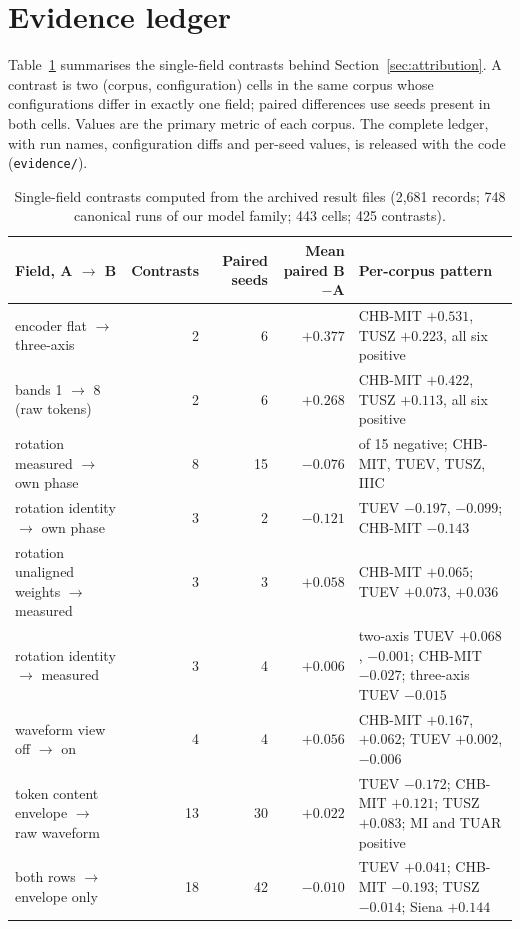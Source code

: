 \clearpage
\setcounter{page}{1}
\maketitlesupplementary

\section{Evidence ledger}
\label{sec:ledger}
Table~\ref{tab:ledger} summarises the single-field contrasts behind Section~\ref{sec:attribution}. A contrast is two (corpus, configuration) cells in the same corpus whose configurations differ in exactly one field; paired differences use seeds present in both cells. Values are the primary metric of each corpus. The complete ledger, with run names, configuration diffs and per-seed values, is released with the code (\texttt{evidence/}).

\begin{table}[t]
\centering
\TableStyle
\caption{Single-field contrasts computed from the archived result files (2,681 records; 748 canonical runs of our model family; 443 cells; 425 contrasts).}
\label{tab:ledger}
\setlength{\tabcolsep}{3pt}
\begin{tabular}{@{}>{\raggedright\arraybackslash}p{4.2cm}rrr>{\raggedright\arraybackslash}p{7.3cm}@{}}
\toprule
Field, A $\to$ B & Contrasts & Paired seeds & Mean paired B$-$A & Per-corpus pattern \\
\midrule
encoder flat $\to$ three-axis & 2 & 6 & $+0.377$ & CHB-MIT $+0.531$, TUSZ $+0.223$, all six positive \\
bands 1 $\to$ 8 (raw tokens) & 2 & 6 & $+0.268$ & CHB-MIT $+0.422$, TUSZ $+0.113$, all six positive \\
rotation measured $\to$ own phase & 8 & 15 & $-0.076$ & 14 of 15 negative; CHB-MIT, TUEV, TUSZ, IIIC \\
rotation identity $\to$ own phase & 3 & 2 & $-0.121$ & TUEV $-0.197$, $-0.099$; CHB-MIT $-0.143$ \\
rotation unaligned weights $\to$ measured & 3 & 3 & $+0.058$ & CHB-MIT $+0.065$; TUEV $+0.073$, $+0.036$ \\
rotation identity $\to$ measured & 3 & 4 & $+0.006$ & two-axis TUEV $+0.068$, $-0.001$; CHB-MIT $-0.027$; three-axis TUEV $-0.015$ \\
waveform view off $\to$ on & 4 & 4 & $+0.056$ & CHB-MIT $+0.167$, $+0.062$; TUEV $+0.002$, $-0.006$ \\
token content envelope $\to$ raw waveform & 13 & 30 & $+0.022$ & TUEV $-0.172$; CHB-MIT $+0.121$; TUSZ $+0.083$; MI and TUAR positive \\
both rows $\to$ envelope only & 18 & 42 & $-0.010$ & TUEV $+0.041$; CHB-MIT $-0.193$; TUSZ $-0.014$; Siena $+0.144$ \\

\end{tabular}
\end{table}
